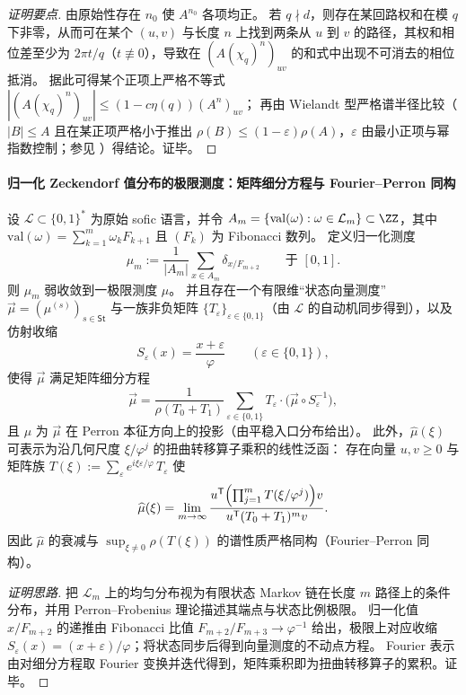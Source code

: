 \begin{proof}[证明要点]
由原始性存在 \(n_0\) 使 \(A^{n_0}\) 各项均正。
若 \(q\nmid d\)，则存在某回路权和在模 \(q\) 下非零，从而可在某个 \((u,v)\) 与长度 \(n\) 上找到两条从 \(u\) 到 \(v\) 的路径，其权和相位差至少为 \(2\pi t/q\)（\(t\not\equiv 0\)），导致在 \((A(\chi_q)^n)_{uv}\) 的和式中出现不可消去的相位抵消。
据此可得某个正项上严格不等式
\(
|(A(\chi_q)^n)_{uv}|\le (1-c\eta(q))(A^n)_{uv}
\)；
再由 Wielandt 型严格谱半径比较（\(|B|\le A\) 且在某正项严格小于推出 \(\rho(B)\le (1-\varepsilon)\rho(A)\)，\(\varepsilon\) 由最小正项与幂指数控制；参见 \cite{Wielandt1950UnzerlegbareNichtnegative}）得结论。证毕。
\end{proof}

\paragraph{归一化 Zeckendorf 值分布的极限测度：矩阵细分方程与 Fourier--Perron 同构}
\begin{theorem}\label{thm:gm-zeck-normalized-limit-measure}
设 \(\mathcal{L}\subset\{0,1\}^\ast\) 为原始 sofic 语言，并令 \(A_m=\{\mathrm{val}(\omega):\omega\in\mathcal{L}_m\}\subset\ZZ\)，其中
\(
\mathrm{val}(\omega)=\sum_{k=1}^{m}\omega_k F_{k+1}
\)
且 \((F_k)\) 为 Fibonacci 数列。
定义归一化测度
\[
\mu_m:=\frac{1}{|A_m|}\sum_{x\in A_m}\delta_{x/F_{m+2}}
\qquad\text{于 }[0,1].
\]
则 \(\mu_m\) 弱收敛到一极限测度 \(\mu\)。
并且存在一个有限维“状态向量测度” \(\vec\mu=(\mu^{(s)})_{s\in\mathsf{St}}\) 与一族非负矩阵 \(\{T_\varepsilon\}_{\varepsilon\in\{0,1\}}\)（由 \(\mathcal{L}\) 的自动机同步得到），以及仿射收缩
\[
S_\varepsilon(x)=\frac{x+\varepsilon}{\varphi}
\qquad(\varepsilon\in\{0,1\}),
\]
使得 \(\vec\mu\) 满足矩阵细分方程
\[
\vec\mu
=\frac{1}{\rho(T_0+T_1)}\sum_{\varepsilon\in\{0,1\}}T_\varepsilon\cdot \bigl(\vec\mu\circ S_\varepsilon^{-1}\bigr),
\]
且 \(\mu\) 为 \(\vec\mu\) 在 Perron 本征方向上的投影（由平稳入口分布给出）。
此外，\(\widehat\mu(\xi)\) 可表示为沿几何尺度 \(\xi/\varphi^j\) 的扭曲转移算子乘积的线性泛函：
存在向量 \(u,v\ge 0\) 与矩阵族
\(
T(\xi):=\sum_{\varepsilon}e^{i\xi\varepsilon/\varphi}\,T_\varepsilon
\)
使
\[
\widehat\mu(\xi)=\lim_{m\to\infty}\frac{u^{\mathsf T}\Bigl(\prod_{j=1}^{m}T(\xi/\varphi^{j})\Bigr)v}{u^{\mathsf T}(T_0+T_1)^{m}v}.
\]
因此 \(\widehat\mu\) 的衰减与 \(\sup_{\xi\ne 0}\rho(T(\xi))\) 的谱性质严格同构（Fourier--Perron 同构）。
\end{theorem}

\begin{proof}[证明思路]
把 \(\mathcal{L}_m\) 上的均匀分布视为有限状态 Markov 链在长度 \(m\) 路径上的条件分布，并用 Perron--Frobenius 理论描述其端点与状态比例极限。
归一化值 \(x/F_{m+2}\) 的递推由 Fibonacci 比值 \(F_{m+2}/F_{m+3}\to \varphi^{-1}\) 给出，极限上对应收缩 \(S_\varepsilon(x)=(x+\varepsilon)/\varphi\)；将状态同步后得到向量测度的不动点方程。
Fourier 表示由对细分方程取 Fourier 变换并迭代得到，矩阵乘积即为扭曲转移算子的累积。证毕。
\end{proof}

